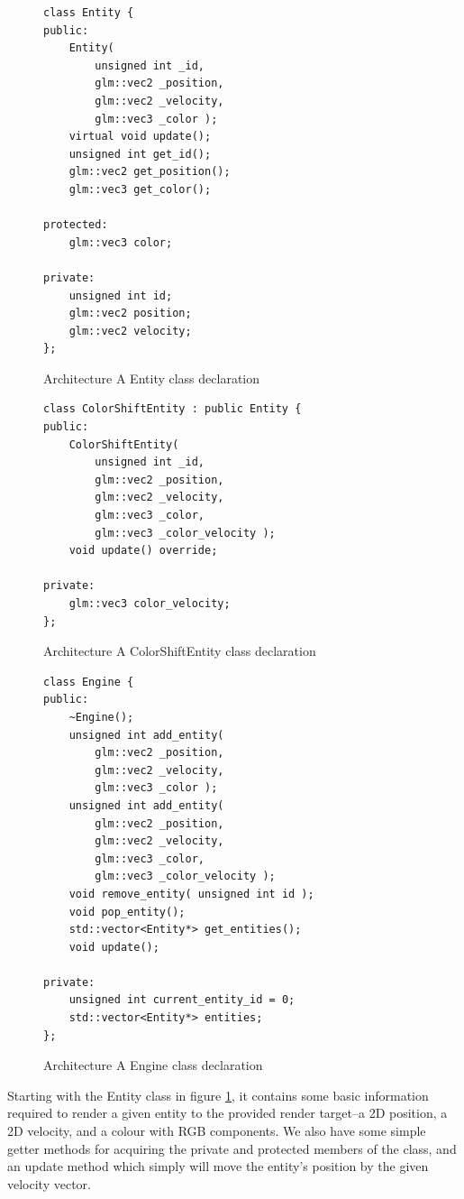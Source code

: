 \documentclass{article}
\begin{document}
\begin{figure}
\centering
\begin{BVerbatim}
class Entity {
public:
    Entity(
        unsigned int _id,
        glm::vec2 _position,
        glm::vec2 _velocity,
        glm::vec3 _color );
    virtual void update();
    unsigned int get_id();
    glm::vec2 get_position();
    glm::vec3 get_color();

protected:
    glm::vec3 color;

private:
    unsigned int id;
    glm::vec2 position;
    glm::vec2 velocity;
};
\end{BVerbatim}
\caption{Architecture A Entity class declaration}
\label{arch_a_entity_header}
\end{figure}

\begin{figure}
\centering
\begin{BVerbatim}
class ColorShiftEntity : public Entity {
public:
    ColorShiftEntity(
        unsigned int _id,
        glm::vec2 _position,
        glm::vec2 _velocity,
        glm::vec3 _color,
        glm::vec3 _color_velocity );
    void update() override;

private:
    glm::vec3 color_velocity;
};
\end{BVerbatim}
\caption{Architecture A ColorShiftEntity class declaration}
\label{arch_a_color_shift_entity_header}
\end{figure}

\begin{figure}
\centering
\begin{BVerbatim}
class Engine {
public:
    ~Engine();
    unsigned int add_entity(
        glm::vec2 _position,
        glm::vec2 _velocity,
        glm::vec3 _color );
    unsigned int add_entity(
        glm::vec2 _position,
        glm::vec2 _velocity,
        glm::vec3 _color,
        glm::vec3 _color_velocity );
    void remove_entity( unsigned int id );
    void pop_entity();
    std::vector<Entity*> get_entities();
    void update();

private:
    unsigned int current_entity_id = 0;
    std::vector<Entity*> entities;
};
\end{BVerbatim}
\caption{Architecture A Engine class declaration}
\label{arch_a_engine_header}
\end{figure}

Starting with the Entity class in figure \ref{arch_a_entity_header}, it contains
some basic information required to render a given entity to the provided render
target--a 2D position, a 2D velocity, and a colour with RGB components. We also
have some simple getter methods for acquiring the private and protected members
of the class, and an update method which simply will move the entity's position
by the given velocity vector.
\end{document}
